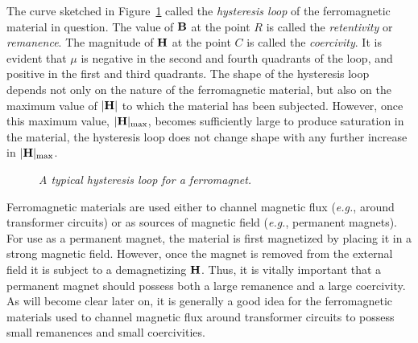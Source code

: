 The curve sketched in Figure~\ref{fhst} called the {\em hysteresis loop}\/ of the ferromagnetic material
in question. The value of ${\bf B}$ at the point $R$ is called the
{\em retentivity}\/ or {\em remanence}. The magnitude of ${\bf H}$ at
the point $C$ is called the {\em coercivity}. It is
evident that $\mu$ is negative in the second and fourth quadrants
of the loop, and positive in the first and third quadrants. The shape
of the hysteresis loop depends not only on the nature of
the ferromagnetic material, but also on the maximum value of $|{\bf H}|$
to which the material has been subjected. However, once this maximum
value, $|{\bf H}|_{\rm max}$, becomes sufficiently large to produce saturation in the material, the hysteresis loop does not change shape with any further
increase in $|{\bf H}|_{\rm max}$. 
\begin{figure}
\centerline{}
\caption{\em A typical hysteresis loop for a ferromagnet.}\label{fhst}
\end{figure}


Ferromagnetic materials are used either to channel magnetic flux
({\em e.g.}, around transformer circuits) or as sources of magnetic
field ({\em e.g.}, permanent magnets). For use as a permanent magnet, the
material is first magnetized by placing it in a strong magnetic
field. However, once the magnet is removed from the external field
it is subject to a demagnetizing ${\bf H}$. Thus, it is vitally important
that a permanent magnet should possess both a large remanence and a large
coercivity. As will become
clear later on, it is generally a good idea for the ferromagnetic materials
used to channel magnetic flux around transformer circuits to
possess small remanences and small coercivities. 

